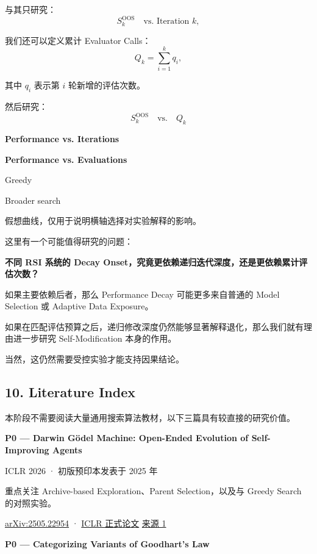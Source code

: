 与其只研究：
\[S_k^{\mathrm{OOS}}
\quad\text{vs. Iteration }k,\]

我们还可以定义累计 Evaluator Calls：
\[Q_k=\sum_{i=1}^{k}q_i,\]

其中 \(q_i\) 表示第 \(i\) 轮新增的评估次数。

然后研究：
\[\boxed{
S_k^{\mathrm{OOS}}
\quad\text{vs.}\quad Q_k
}\]

\textbf{Performance vs. Iterations}


\textbf{Performance vs. Evaluations}


Greedy

Broader search

假想曲线，仅用于说明横轴选择对实验解释的影响。

这里有一个可能值得研究的问题：

\textbf{不同 RSI 系统的 Decay Onset，究竟更依赖递归迭代深度，还是更依赖累计评估次数？}

如果主要依赖后者，那么 Performance Decay 可能更多来自普通的 Model Selection 或 Adaptive Data Exposure。

如果在匹配评估预算之后，递归修改深度仍然能够显著解释退化，那么我们就有理由进一步研究 Self-Modification 本身的作用。

当然，这仍然需要受控实验才能支持因果结论。

\hypertarget{part-3-40-0001-literature-index}{%
\subsection{10. Literature Index}\label{part-3-40-0001-literature-index}}

本阶段不需要阅读大量通用搜索算法教材，以下三篇具有较直接的研究价值。

\textbf{P0 --- Darwin Gödel Machine: Open-Ended Evolution of Self-Improving Agents}

ICLR 2026 · 初版预印本发表于 2025 年

重点关注 Archive-based Exploration、Parent Selection，以及与 Greedy Search 的对照实验。

\href{https://arxiv.org/abs/2505.22954}{arXiv:2505.22954} · \href{https://openreview.net/pdf?id=pUpzQZTvGY}{ICLR 正式论文} \href{https://openreview.net/pdf?id=pUpzQZTvGY}{来源 1}

\textbf{P0 --- Categorizing Variants of Goodhart's Law}

